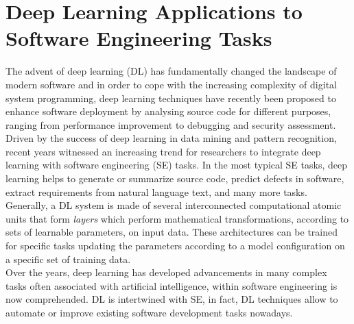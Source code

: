\chapter{Deep Learning Applications to Software Engineering Tasks}
The advent of deep learning (DL) has fundamentally changed the landscape of modern software and in order to cope with 
the increasing complexity of digital system programming, deep learning techniques have recently been proposed 
to enhance software deployment by analysing source code for different purposes, ranging from performance improvement 
to debugging and security assessment. Driven by the success of deep learning in data mining and pattern 
recognition, recent years witnessed an increasing trend for researchers to integrate deep learning with software engineering (SE) 
tasks. In the most typical SE tasks, deep learning helps to generate or summarize source code, predict defects in software, extract requirements from natural language text, 
and many more tasks.
Generally, a DL system is made of several interconnected computational atomic units that form \textit{layers}
which perform mathematical transformations, according to sets of learnable parameters, on input data. These architectures
can be trained for specific tasks updating the parameters according to a model configuration on a specific set of training data. \\ Over the years, 
deep learning has developed advancements in many complex tasks often associated with artificial intelligence, within software engineering 
is now comprehended. DL is intertwined with SE, in fact, DL techniques allow to automate or improve existing software 
development tasks nowadays. 

